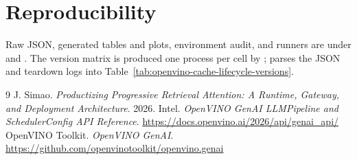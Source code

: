 \documentclass[10pt]{article}
\begin{document}
\section*{Reproducibility}
Raw JSON, generated tables and plots, environment audit, and runners are under
 and
.
The version matrix is produced one process per cell by
;
 parses the JSON and teardown logs
into Table~\ref{tab:openvino-cache-lifecycle-versions}.

\begin{thebibliography}{9}
J. Simao. \emph{Productizing Progressive Retrieval Attention: A Runtime,
Gateway, and Deployment Architecture}. 2026.
Intel. \emph{OpenVINO GenAI LLMPipeline and SchedulerConfig API Reference}.
\url{https://docs.openvino.ai/2026/api/genai_api/}
OpenVINO Toolkit. \emph{OpenVINO GenAI}.
\url{https://github.com/openvinotoolkit/openvino.genai}
\end{thebibliography}
\end{document}
